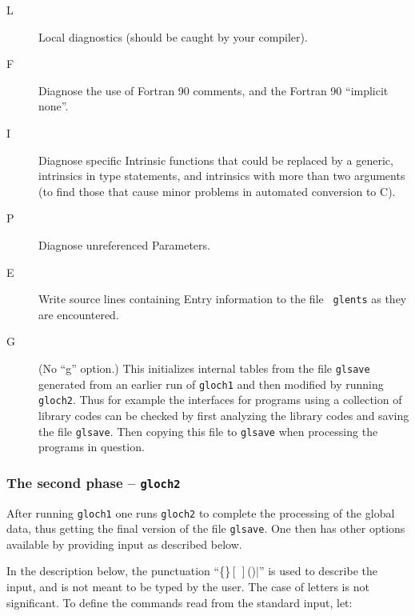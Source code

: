 \documentclass[twoside]{MATH77}
\begin{document}
\begin{description}
\item[L] Local diagnostics (should be caught by your compiler).
\item[F] Diagnose the use of Fortran 90 comments, and the Fortran 90
``implicit none''.
\item[I] Diagnose specific Intrinsic functions that could be replaced by
a generic, intrinsics in type statements, and intrinsics with more than
two arguments (to find those that cause minor problems in automated
conversion to C).
\item[P] Diagnose unreferenced Parameters.
\item[E] Write source lines containing Entry information to the file {\tt
glents} as they are encountered.
\item[G] (No ``g'' option.) This initializes internal tables from the file
{\tt glsave} generated from an earlier run of {\tt gloch1} and then
modified by running {\tt gloch2}.  Thus for example the interfaces for
programs using a collection of library codes can be checked by first
analyzing the library codes and saving the file {\tt glsave}.  Then
copying this file to {\tt glsave} when processing the programs in
question.
\end{description}

\subsubsection{The second phase -- {\tt gloch2}}
After running {\tt gloch1} one runs {\tt gloch2} to complete the
processing of the global data, thus getting the final version of the file
{\tt glsave}.  One then has other options available by providing input
as described below.

In the description below, the punctuation ``\{\}$[\,]$()$|$'' is used to
describe the input, and is not meant to be typed by the user. The case
of letters is not significant.  To define the commands read from the
standard input, let:
\end{document}
